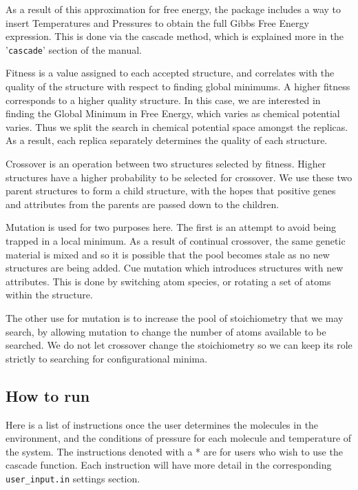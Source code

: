 As a result of this approximation for free energy, the package includes a way to insert Temperatures and Pressures to obtain the full Gibbs Free Energy expression. This is done via the cascade method, which is explained more in the '\texttt{cascade}' section of the manual.

Fitness is a value assigned to each accepted structure, and correlates with the quality of the structure with respect to finding global minimums. A higher fitness corresponds to a higher quality structure. In this case, we are interested in finding the Global Minimum in Free Energy, which varies as chemical potential varies. Thus we split the search in chemical potential space amongst the replicas. As a result, each replica separately determines the quality of each structure.

Crossover is an operation between two structures selected by fitness. Higher structures have a higher probability to be selected for crossover. We use these two parent structures to form a child structure, with the hopes that positive genes and attributes from the parents are passed down to the children.

Mutation is used for two purposes here. The first is an attempt to avoid being trapped in a local minimum. As a result of continual crossover, the same genetic material is mixed and so it is possible that the pool becomes stale as no new structures are being added. Cue mutation which introduces structures with new attributes. This is done by switching atom species, or rotating a set of atoms within the structure.

The other use for mutation is to increase the pool of stoichiometry that we may search, by allowing mutation to change the number of atoms available to be searched. We do not let crossover change the stoichiometry so we can keep its role strictly to searching for configurational minima.

\subsection{How to run}

Here is a list of instructions once the user determines the molecules in the environment, and the conditions of pressure for each molecule and temperature of the system. The instructions denoted with a * are for users who wish to use the cascade function. Each instruction will have more detail in the corresponding \texttt{user\_input.in} settings section.

